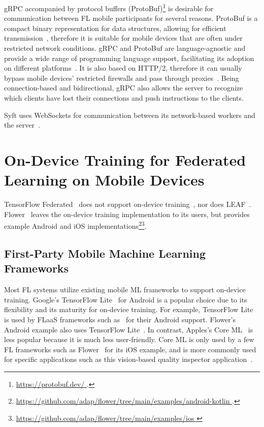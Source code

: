 \documentclass[conference]{IEEEtran}
\begin{document}
gRPC accompanied by protocol buffers (ProtoBuf)\footnote{\url{
    https://protobuf.dev/
}.} is desirable for communication between FL mobile participants for
several reasons.
ProtoBuf is a compact binary representation for data structures,
allowing for efficient transmission~\cite{popic2016performance},
therefore it is suitable for mobile devices that
are often under restricted network conditions.
gRPC and ProtoBuf are language-agnostic and
provide a wide range of programming language support,
facilitating its adoption on different platforms~\cite{araujo2020performance}.
It is also based on HTTP/2,
therefore it can usually bypass mobile devices' restricted firewalls and
pass through proxies~\cite{araujo2020performance}.
Being connection-based and bidirectional,
gRPC also allows the server to recognize
which clients have lost their connections and
push instructions to the clients.

Syft uses WebSockets for communication between its network-based workers and
the server~\cite{Ziller2021}.

\section{On-Device Training for Federated Learning on Mobile Devices}

TensorFlow Federated~\cite{tff} does not support
on-device training~\cite{kholod2020open},
nor does LEAF~\cite{caldas2018leaf}.
Flower~\cite{beutel2020flower} leaves the on-device training implementation to
its users,
but provides example Android and iOS implementations\footnote{\url{
    https://github.com/adap/flower/tree/main/examples/android-kotlin
}.}\footnote{\url{
    https://github.com/adap/flower/tree/main/examples/ios
}}.

\subsection{First-Party Mobile Machine Learning Frameworks}

Most FL systems utilize existing mobile ML frameworks to
support on-device training.
Google's TensorFlow Lite~\cite{tensorflow2015-whitepaper,abadi2016tensorflow}
for Android is
a popular choice due to its flexibility and
its maturity for on-device training.
For example, TensorFlow Lite is used by FLaaS frameworks such as~\cite{
    kourtellis2020flaas,katevas2022flaas}
for their Android support.
Flower's Android example also uses
TensorFlow Lite~\cite{beutel2020flower,mathur2021ondevice}.
In contrast, Apples's Core ML~\cite{coreml} is less popular because
it is much less user-friendly.
Core ML is only used by a few FL frameworks such as
Flower~\cite{beutel2020flower} for its iOS example,
and is more commonly used for specific applications
such as this vision-based quality inspector application~\cite{bharti2022edge}.
\end{document}

